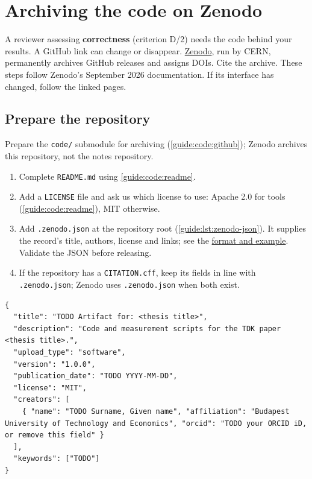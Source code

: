 \chapter{Archiving the code on Zenodo}\label{guide:zenodo}
A reviewer assessing \textbf{correctness} (criterion D/2) needs the code behind your results. A GitHub link can change or disappear.
\href{https://zenodo.org/}{Zenodo}, run by CERN, permanently archives GitHub releases and assigns DOIs. Cite the archive.
These steps follow Zenodo's September 2026 documentation. If its interface has changed, follow the linked pages.

\section{Prepare the repository}
Prepare the \texttt{code/} submodule for archiving (\cref{guide:code:github}); Zenodo archives this repository, not the notes repository.
\begin{enumerate}
  \item Complete \texttt{README.md} using \cref{guide:code:readme}.
  \item Add a \texttt{LICENSE} file and ask us which license to use: Apache 2.0 for tools (\cref{guide:code:readme}), MIT otherwise.
  \item Add \texttt{.zenodo.json} at the repository root (\cref{guide:lst:zenodo-json}). It supplies the record's title, authors, license and links; see the \href{https://help.zenodo.org/docs/github/describe-software/zenodo-json/}{format and example}. Validate the JSON before releasing.
  \item If the repository has a \texttt{CITATION.cff}, keep its fields in line with \texttt{.zenodo.json}; Zenodo uses \texttt{.zenodo.json} when both exist.
\end{enumerate}

\begin{listing}[!ht]
\begin{verbatim}
{
  "title": "TODO Artifact for: <thesis title>",
  "description": "Code and measurement scripts for the TDK paper <thesis title>.",
  "upload_type": "software",
  "version": "1.0.0",
  "publication_date": "TODO YYYY-MM-DD",
  "license": "MIT",
  "creators": [
    { "name": "TODO Surname, Given name", "affiliation": "Budapest University of Technology and Economics", "orcid": "TODO your ORCID iD, or remove this field" }
  ],
  "keywords": ["TODO"]
}
\end{verbatim}
\caption{A minimal \texttt{.zenodo.json}.}\label{guide:lst:zenodo-json}
\end{listing}

